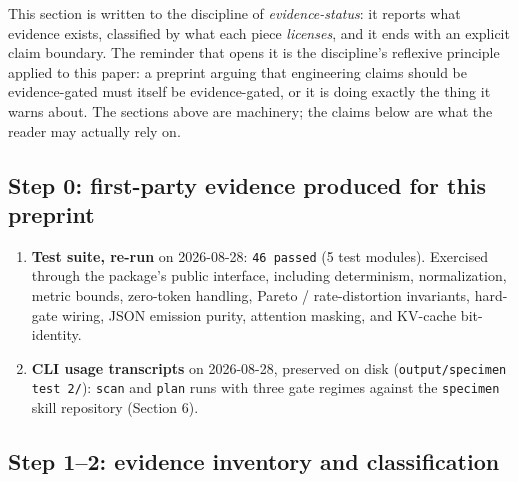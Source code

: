 \label{sec:eval}

This section is written to the discipline of \emph{evidence-status}: it reports
what evidence exists, classified by what each piece \emph{licenses}, and it ends
with an explicit claim boundary. The reminder that opens it is the discipline's
reflexive principle applied to this paper: a preprint arguing that engineering
claims should be evidence-gated must itself be evidence-gated, or it is doing
exactly the thing it warns about. The sections above are machinery; the claims
below are what the reader may actually rely on.

\subsection{Step 0: first-party evidence produced for this preprint}

\begin{enumerate}[leftmargin=*]
  \item \textbf{Test suite, re-run} on 2026-08-28: \texttt{46 passed}
  (5 test modules). Exercised through the package's public interface, including
  determinism, normalization, metric bounds, zero-token handling, Pareto /
  rate-distortion invariants, hard-gate wiring, JSON emission purity, attention
  masking, and KV-cache bit-identity.
  \item \textbf{CLI usage transcripts} on 2026-08-28, preserved on disk
  (\texttt{output/specimen test 2/}): \texttt{scan} and \texttt{plan} runs with
  three gate regimes against the \texttt{specimen} skill repository (Section 6).
\end{enumerate}

\subsection{Step 1--2: evidence inventory and classification}

